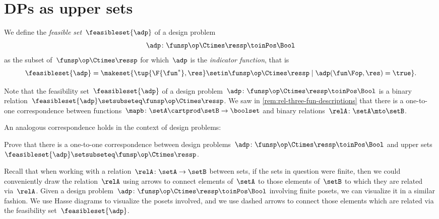 \section{DPs as upper sets}

\begin{definition}
    \label{def:dp-feasible-set}
    We define the \emph{feasible set}~$\feasibleset{\adp}$ of a design problem
    \begin{equation}
        \label{eq:generic-design-prob}
        \adp\colon \funsp\op \Ctimes \ressp \toinPos \Bool
    \end{equation}
    as the subset of~$\funsp \op\Ctimes \ressp$ for which~$\adp$ is the \emph{indicator function}, that is%
    \begin{equation}
        \label{eq:design-prob-as-upper-set}
        \feasibleset{\adp} = \makeset{ \tup{\F{\fun^*},\res} \setin \funsp \op\Ctimes \ressp  \mid %
            \adp(\fun\Fop, \res) = \true %
        }.
    \end{equation}
\end{definition}

Note that the feasibility set~$\feasibleset{\adp}$ of a design problem~$\adp \colon \funsp \op \Ctimes \ressp\toinPos \Bool$ is a binary relation~$\feasibleset{\adp} \setsubseteq \funsp\op \Ctimes \ressp$.
We saw in \cref{rem:rel-three-fun-descriptions} that there is a one-to-one correspondence between functions~$\mapb \colon \setA \cartprod \setB \to \boolset$ and binary relations~$\relA\colon \setA \mto \setB$.

An analogous correspondence holds in the context of design problems:

\begin{exercise}
    \label{ex:adp-uppersets}
    Prove that there is a one-to-one correspondence between design problems~$\adp \colon \funsp \op \Ctimes \ressp\toinPos \Bool$ and upper sets~$\feasibleset{\adp} \setsubseteq \funsp\op \Ctimes \ressp$.
\end{exercise}
\begin{solution}
    \missingsolution
\end{solution}

Recall that when working with a relation~$\relA \colon \setA \to \setB$ between sets, if the sets in question were finite, then we could conveniently draw the relation~$\relA$ using arrows to connect elements of~$\setA$ to those elements of~$\setB$ to which they are related via~$\relA$.
Given a design problem~$\adp \colon \funsp \op \Ctimes \ressp\toinPos \Bool$ involving finite posets, we can visualize it in a similar fashion.
We use Hasse diagrams to visualize the posets involved, and we use dashed arrows to connect those elements which are related via the feasibility set~$\feasibleset{\adp}$.

